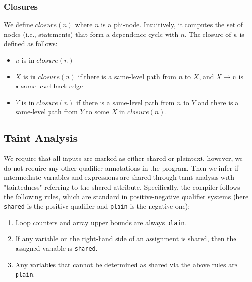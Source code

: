 \subsubsection{Closures}

We define $\mathit{closure}(n)$ where $n$ is a phi-node. Intuitively, it computes the set of nodes (i.e., statements) that form a dependence cycle with $n$. The closure of $n$ is defined as follows:
\begin{itemize}
\item $n$ is in $\mathit{closure}(n)$
\item $X$ is in $\mathit{closure}(n)$ if there is a same-level path from $n$ to $X$, and $X \rightarrow n$ is a same-level back-edge.
\item $Y$ is in $\mathit{closure}(n)$ if there is a same-level path from $n$ to $Y$ and there is a same-level path from $Y$ to some $X$ in $\mathit{closure}(n)$.
\end{itemize}

\subsection{Taint Analysis}
\label{sec:taint}

We require that all inputs are marked as either shared or plaintext, however, we do not require any other qualifier annotations in the program. Then we infer if intermediate variables and expressions are shared through taint analysis with "taintedness" referring to the shared attribute.  Specifically, the compiler follows the following rules, which are standard in positive-negative qualifier systems (here \texttt{shared} is the positive qualifier and \texttt{plain} is the negative one):
\begin{enumerate}
\item Loop counters and array upper bounds are always \texttt{plain}.
\item If any variable on the right-hand side of an assignment is shared, then the assigned variable is \texttt{shared}.
\item Any variables that cannot be determined as shared via the above rules are \texttt{plain}.
\end{enumerate}

